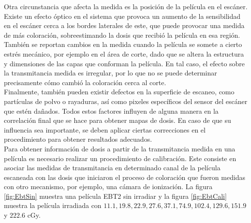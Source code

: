 Otra circunstancia que afecta la medida es la posición de la película en el escáner. Existe un efecto óptico en el sistema que provoca un aumento de la sensibilidad en el escáner cerca a los bordes laterales de este, que puede provocar una medida de más coloración, sobreestimando la dosis que recibió la película en esa región.\\

También se reportan cambios en la medida cuando la película se somete a cierto estrés mecánico\cite{Yu2006}, por ejemplo en el área de corte, dado que se altera la estructura y dimensiones de las capas que conforman la película. En tal caso, el efecto sobre la transmitancia medida es irregular, por lo que no se puede determinar precisamente cómo cambió la coloración cerca al corte.\\

Finalmente, también pueden existir defectos en la superficie de escaneo, como partículas de polvo o rayaduras, así como pixeles específicos del sensor del escáner que estén dañados. Todos estos factores influyen de alguna manera en la correlación final que se hace para obtener mapas de dosis. En caso de que su influencia sea importante, se deben aplicar ciertas correcciones en el procedimiento para obtener resultados adecuados.\\

Para obtener información de dosis a partir de la transmitancia medida en una película es necesario realizar un procedimiento de calibración. Este consiste en asociar las medidas de transmitancia en determinado canal de la película escaneada con las dosis que iniciaron el proceso de coloración que fueron medidas con otro mecanismo, por ejemplo, una cámara de ionización. La figura \ref{fig:EbtSin} muestra una película EBT2 sin irradiar y la figura \ref{fig:EbtCali} muestra la película irradiada con $11.1 ,  19.8, 22.9, 27.6, 37.1, 74.9, 102.4, 129.6, 151.9$ y $222.6 $ cGy.\\

